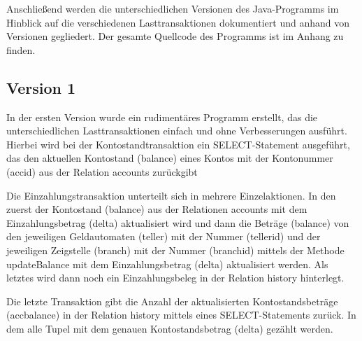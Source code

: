Anschließend werden die unterschiedlichen Versionen des Java-Programms im Hinblick auf die verschiedenen Lasttransaktionen dokumentiert und anhand von Versionen gegliedert.
Der gesamte Quellcode des Programms ist im Anhang zu finden.

\subsection{Version 1}\label{subsec:version1}
In der ersten Version wurde ein rudimentäres Programm erstellt, das die unterschiedlichen Lasttransaktionen einfach und ohne Verbesserungen ausführt.
Hierbei wird bei der Kontostandtransaktion ein SELECT-Statement ausgeführt, das den aktuellen Kontostand (balance) eines Kontos mit der Kontonummer (accid) aus der Relation accounts zurückgibt

Die Einzahlungstransaktion unterteilt sich in mehrere Einzelaktionen.
In den zuerst der Kontostand (balance) aus der Relationen accounts mit dem Einzahlungsbetrag (delta) aktualisiert wird und dann die Beträge (balance) von den jeweiligen Geldautomaten (teller) mit der Nummer (tellerid) und der jeweiligen Zeigstelle (branch) mit der Nummer (branchid) mittels der Methode updateBalance mit dem Einzahlungsbetrag (delta) aktualisiert werden.
Als letztes wird dann noch ein Einzahlungsbeleg in der Relation history hinterlegt.


Die letzte Transaktion gibt die Anzahl der aktualisierten Kontostandsbeträge (accbalance) in der Relation history mittels eines SELECT-Statements zurück.
In dem alle Tupel mit dem genauen Kontostandsbetrag (delta) gezählt werden.


